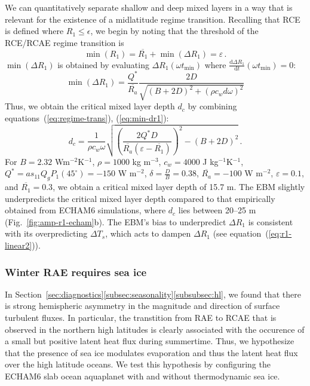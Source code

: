 \documentclass{ametsocV5}
\begin{document}
    We can quantitatively separate shallow and deep mixed layers in a way that is relevant for the existence of a midlatitude regime transition. Recalling that RCE is defined where $R_1 \le \epsilon$, we begin by noting that the threshold of the RCE/RCAE regime transition is
    \begin{equation} \label{eq:regime-trans}
      \min(R_{1}) = \overline{R_{1}} + \min(\Delta R_{1}) = \varepsilon \, .
    \end{equation}
    $\min(\Delta R_1)$ is obtained by evaluating $\Delta R_1(\omega t_{\mathrm{min}})$ where $\frac{\mathrm{d}\Delta R_1}{\mathrm{d}t}(\omega t_{\mathrm{min}})=0$:
    \begin{equation} \label{eq:min-dr1}
      \min(\Delta R_{1}) = \frac{Q^{*}}{\overline{R_{a}}}\frac{2D}{\sqrt{(B+2D)^2+(\rho c_w d \omega)^{2}}}
    \end{equation}
    Thus, we obtain the critical mixed layer depth $d_{c}$ by combining equations~(\ref{eq:regime-trans}), (\ref{eq:min-dr1}):
    \begin{equation} \label{eq:crit-d}
      d_{c} = \frac{1}{\rho c_{w} \omega}\sqrt{\left(\frac{2 Q^{*} D}{\overline{R_{a}}(\varepsilon-\overline{R_{1}})}\right)^{2}-(B+2D)^2} \, .
    \end{equation}
    For $B=2.32$ Wm$^{-2}$K$^{-1}$, $\rho=1000$ kg m$^{-3}$, $c_{w}=4000$ J kg$^{-1} $K$^{-1}$, $Q^{*}=as_{11}Q_gP_1(45^\circ)=-150$ W m$^{-2}$, $\delta=\frac{D}{B}=0.38$, $\overline{R_{a}}=-100$ W m$^{-2}$, $\varepsilon=0.1$, and $\overline{R_{1}}=0.3$, we obtain a critical mixed layer depth of 15.7 m. The EBM slightly underpredicts the critical mixed layer depth compared to that empirically obtained from ECHAM6 simulations, where $d_c$ lies between 20--25 m (Fig.~\ref{fig:amp-r1-echam}b). The EBM's bias to underpredict $\Delta R_1$ is consistent with its overpredicting $\Delta T_s$, which acts to dampen $\Delta R_1$ (see equation~(\ref{eq:r1-linear2})).

  
    \subsubsection{Winter RAE requires sea ice}

    In Section~\ref{sec:diagnostics}\ref{subsec:seasonality}\ref{subsubsec:hl}, we found that there is strong hemispheric asymmetry in the magnitude and direction of surface turbulent fluxes. In particular, the transtition from RAE to RCAE that is observed in the northern high latitudes is clearly associated with the occurence of a small but positive latent heat flux during summertime. Thus, we hypothesize that the presence of sea ice modulates evaporation and thus the latent heat flux over the high latitude oceans. We test this hypothesis by configuring the ECHAM6 slab ocean aquaplanet with and without thermodynamic sea ice. 
    
\end{document}
